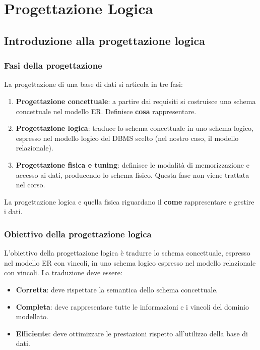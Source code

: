 \chapter{Progettazione Logica}
\section{Introduzione alla progettazione logica}
\subsection{Fasi della progettazione}
La progettazione di una base di dati si articola in tre fasi:
\begin{enumerate}
    \item \textbf{Progettazione concettuale}: a partire dai requisiti
    si costruisce uno schema concettuale nel modello ER.
    Definisce \textbf{cosa} rappresentare.

    \item \textbf{Progettazione logica}: traduce lo schema concettuale
    in uno schema logico, espresso nel modello logico del DBMS scelto
    (nel nostro caso, il modello relazionale).

    \item \textbf{Progettazione fisica e tuning}: definisce le modalità
    di memorizzazione e accesso ai dati, producendo lo schema fisico.
    Questa fase non viene trattata nel corso.
\end{enumerate}
\noindent
La progettazione logica e quella fisica riguardano il
\textbf{come} rappresentare e gestire i dati.

\subsection{Obiettivo della progettazione logica}

L'obiettivo della progettazione logica è tradurre lo schema
concettuale, espresso nel modello ER con vincoli, in uno
schema logico espresso nel modello relazionale con vincoli.
La traduzione deve essere:

\begin{itemize}
    \item \textbf{Corretta}: deve rispettare la semantica dello
    schema concettuale.
    \item \textbf{Completa}: deve rappresentare tutte le informazioni
    e i vincoli del dominio modellato.
    \item \textbf{Efficiente}: deve ottimizzare le prestazioni
    rispetto all'utilizzo della base di dati.
\end{itemize}
\noindent

